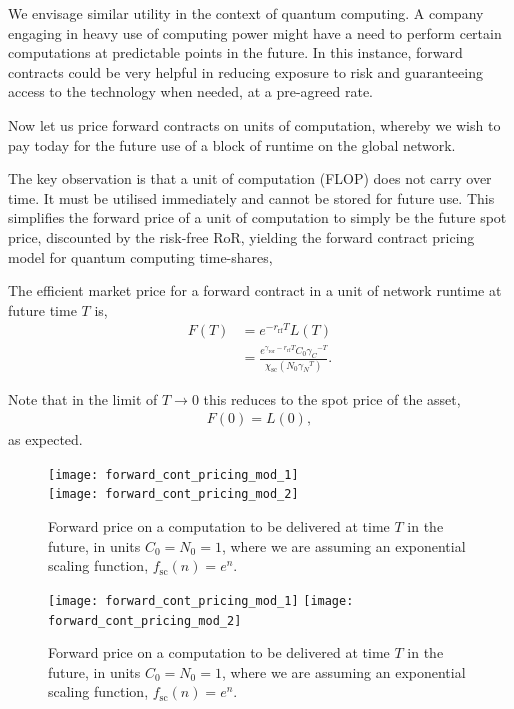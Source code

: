 We envisage similar utility in the context of quantum computing. A company engaging in heavy use of computing power might have a need to perform certain computations at predictable points in the future. In this instance, forward contracts could be very helpful in reducing exposure to risk and guaranteeing access to the technology when needed, at a pre-agreed rate.

Now let us price forward contracts on units of computation, whereby we wish to pay today for the future use of a block of runtime on the global network.

The key observation is that a unit of computation (FLOP) does not carry over time. It must be utilised immediately and cannot be stored for future use. This simplifies the forward price of a unit of computation to simply be the future spot price, discounted by the risk-free RoR, yielding the forward contract pricing model for quantum computing time-shares,
\begin{definition} \label{def:forward_cont}
The efficient market price for a forward contract in a unit of network runtime at future time $T$ is,
\begin{align}
F(T) &= e^{-r_\mathrm{rf}T} L(T)\nonumber\\
&=\frac{e^{\gamma_\mathrm{ror}-r_\mathrm{rf}T} C_0{\gamma_C}^{-T}}{\chi_\mathrm{sc}(N_0 {\gamma_N}^T)}.
\end{align}
\end{definition}

Note that in the limit of \mbox{$T\to 0$} this reduces to the spot price of the asset,
\begin{align}
	F(0)=L(0),
\end{align}
as expected.

\pubmode
\begin{figure}[!htbp]
\texttt{[image: forward\_cont\_pricing\_mod\_1]}\\
\texttt{[image: forward\_cont\_pricing\_mod\_2]}
\captionspacefig \caption{Forward price on a computation to be delivered at time $T$ in the future, in units \mbox{$C_0=N_0=1$}, where we are assuming an exponential scaling function, \mbox{$f_\mathrm{sc}(n)=e^n$}.}\label{fig:forward_cont_pricing_mod}
\end{figure}
\else
\begin{figure}[!htbp]
\texttt{[image: forward\_cont\_pricing\_mod\_1]}
\texttt{[image: forward\_cont\_pricing\_mod\_2]}
\captionspacefig \caption{Forward price on a computation to be delivered at time $T$ in the future, in units \mbox{$C_0=N_0=1$}, where we are assuming an exponential scaling function, \mbox{$f_\mathrm{sc}(n)=e^n$}.}\label{fig:forward_cont_pricing_mod}
\end{figure}
\fi

